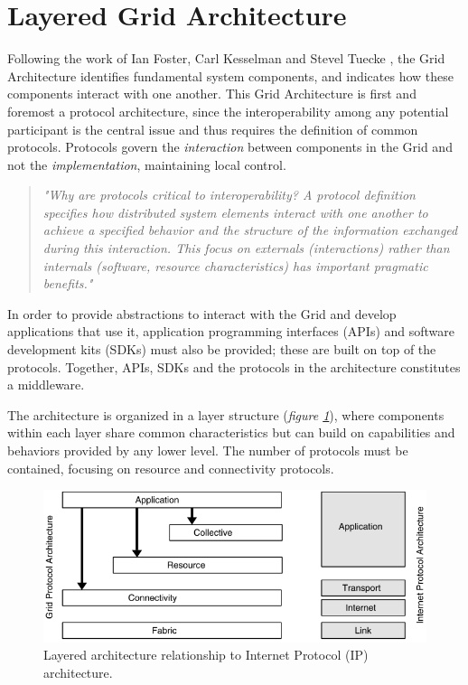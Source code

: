 \section{Layered Grid Architecture}
Following the work of Ian Foster, Carl Kesselman and Stevel Tuecke \cite{the_anatomy_of_the_grid}, the Grid Architecture identifies fundamental system components, and indicates how these components interact with one another. This Grid Architecture is first and foremost a protocol architecture, since the interoperability among any potential participant is the central issue and thus requires the definition of common protocols. Protocols govern the \textit{interaction} between components in the Grid and not the \textit{implementation}, maintaining local control.

\begin{quotation}
    \textit{"Why are protocols critical to interoperability? A protocol definition specifies how distributed system elements interact with one another to achieve a specified behavior and the structure of the information exchanged during this interaction. This focus on externals (interactions) rather than internals (software, resource characteristics) has important pragmatic benefits." \cite{the_anatomy_of_the_grid}}
\end{quotation}

In order to provide abstractions to interact with the Grid and develop applications that use it, application programming interfaces (APIs) and software development kits (SDKs) must also be provided; these are built on top of the protocols.
Together, APIs, SDKs and the protocols in the architecture constitutes a middleware.

The architecture is organized in a layer structure (\textit{figure \ref{fig:grid_protocol_architecture_and_internet_protocol_architecture}}), where components within each layer share common characteristics but can build on capabilities and behaviors provided by any lower level. The number of protocols must be contained, focusing on resource and connectivity protocols.

\begin{figure}[!ht]
    \centering
    \includegraphics[scale=1]{document/chapters/chapter_2/images/grid_protocol_architecture_and_internet_protocol_architecture.png}
    \caption{Layered architecture relationship to Internet Protocol (IP) architecture. \cite{the_anatomy_of_the_grid}}
    \label{fig:grid_protocol_architecture_and_internet_protocol_architecture}
\end{figure}

